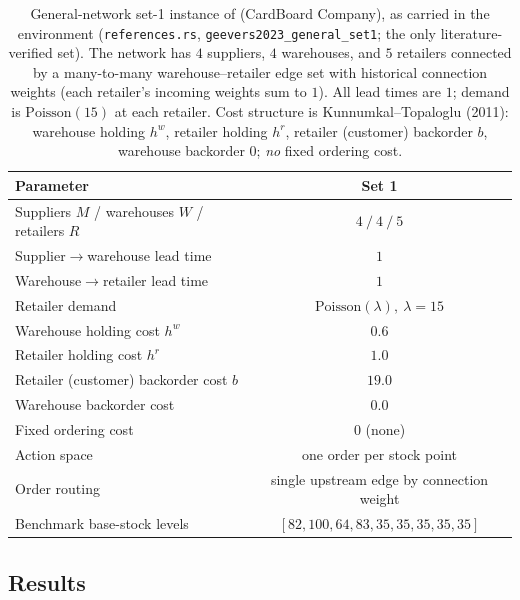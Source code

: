 \begin{table}[!htbp]
\centering
\caption{General-network set-1 instance of \citet{geevers2024cardboard} (CardBoard Company), as carried
in the environment (\texttt{references.rs}, \texttt{geevers2023\_general\_set1}; the only
literature-verified set). The network has $4$ suppliers, $4$ warehouses, and $5$ retailers connected
by a many-to-many warehouse--retailer edge set with historical connection weights (each retailer's
incoming weights sum to $1$). All lead times are $1$; demand is $\mathrm{Poisson}(15)$ at each
retailer. Cost structure is Kunnumkal--Topaloglu (2011): warehouse holding $h^w$, retailer holding
$h^r$, retailer (customer) backorder $b$, warehouse backorder $0$; \emph{no} fixed ordering cost.}
\label{tab:gbk-params}
\begin{tabular}{lc}
\toprule
Parameter & Set 1 \\
\midrule
\addlinespace[2pt]
Suppliers $M$ / warehouses $W$ / retailers $R$ & $4\ /\ 4\ /\ 5$ \\
Supplier$\to$warehouse lead time & $1$ \\
Warehouse$\to$retailer lead time & $1$ \\
Retailer demand & $\mathrm{Poisson}(\lambda),\ \lambda=15$ \\
\addlinespace[2pt]
Warehouse holding cost $h^w$ & $0.6$ \\
Retailer holding cost $h^r$ & $1.0$ \\
Retailer (customer) backorder cost $b$ & $19.0$ \\
Warehouse backorder cost & $0.0$ \\
Fixed ordering cost & $0$ (none) \\
\addlinespace[2pt]
Action space & one order per stock point \\
Order routing & single upstream edge by connection weight \\
Benchmark base-stock levels & $[82,100,64,83,35,35,35,35,35]$ \\
\bottomrule
\end{tabular}
\end{table}
\FloatBarrier

\subsection{Results}
\label{sec:gbk-results}

